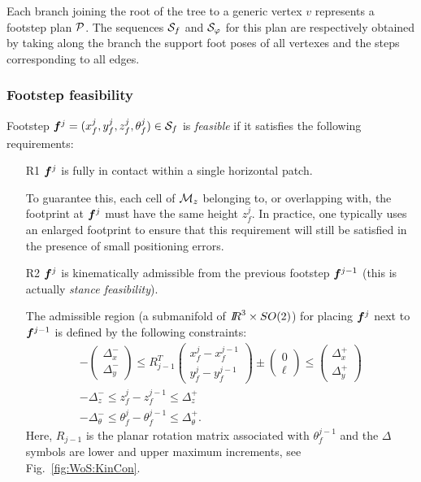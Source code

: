 Each branch joining the root of the tree to a generic vertex $v$ represents a
footstep plan $\cal P$. The sequences ${\cal S}_f$ and ${\cal S}_\varphi$ for
this plan are respectively obtained by taking along the branch the support foot
poses of all vertexes and the steps corresponding to all edges.

\medskip

\subsubsection{Footstep feasibility}
Footstep ${\bm{f}}^j=(x_f^j,y_f^j,z_f^j,\theta_f^j) \in {\cal S}_f$ is
\textit{feasible} if it satisfies the following requirements:   

\begin{itemize}

\smallskip
\item[R1] ${\bm{f}}^j$ is fully in contact within a single horizontal patch.

\smallskip
To guarantee this, each cell of ${\cal M}_{z}$ belonging to, or overlapping
with, the footprint at ${\bm{f}}^j$ must have the same height $z_{f}^j$.
In practice, one typically uses an enlarged footprint to ensure that this
requirement will still be satisfied in the presence of small positioning errors.

\smallskip
\item[R2] ${\bm{f}}^j$ is kinematically admissible from the previous footstep
${\bm{f}}^{j-1}$ (this is actually {\em stance feasibility}).

\smallskip
The admissible region (a submanifold of ${I\!\!R}^3 \times SO(2)$) for placing
${\bm{f}}^{j}$ next to ${\bm{f}}^{j-1}$ is defined by the following constraints:
\begin{gather} 
-\begin{pmatrix}
\Delta_x^- \\[5pt] \Delta_y^-
\end{pmatrix}
\le
R_{j-1}^T \begin{pmatrix}
x_f^j - x_f^{j-1} \\[5pt] y_f^j - y_f^{j-1}
\end{pmatrix}
\pm \begin{pmatrix}
0 \\ \ell
\end{pmatrix}
\le
\begin{pmatrix}
\Delta_x^+ \\[5pt] \Delta_y^+
\end{pmatrix} \label{eq:WoS:XYAdmissible}\\[5pt]
-\Delta_z^- \le z_f^j - z_f^{j-1} \le \Delta_z^+
\label{eq:WoS:ZAdmissible}\\[5pt]
-\Delta_\theta^- \le \theta_f^j - \theta_f^{j-1} \le \Delta_\theta^+. \label{eq:WoS:ThetaAdmissible}
\end{gather}
Here, $R_{j-1}$ is the planar rotation matrix associated with $\theta_f^{j-1}$
and the $\Delta$ symbols are lower and upper maximum increments, see
Fig.~\ref{fig:WoS:KinCon}.


\end{itemize}
